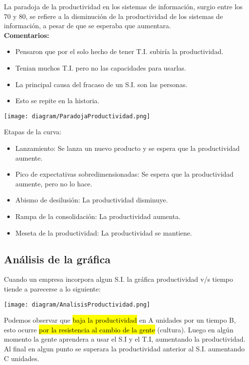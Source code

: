 \documentclass{templateNote}
\begin{document}
La paradoja de la productividad en los sistemas de informaci\'on, surgio entre los 70 y 80, se refiere a la disminuci\'on de la productividad de los sistemas de informaci\'on, a pesar de que se esperaba que aumentara.\\
\textbf{Comentarios:}
\begin{itemize}
    \item Pensaron que por el solo hecho de tener T.I. subir\'ia la productividad.
    \item Tenian muchos T.I. pero no las capacidades para usarlas.
    \item La principal causa del fracaso de un S.I. son las personas.
    \item Esto se repite en la historia.
\end{itemize}
\begin{center}
    \texttt{[image: diagram/ParadojaProductividad.png]}
\end{center}
Etapas de la curva:
\begin{itemize}
    \item Lanzamiento: Se lanza un nuevo producto y se espera que la productividad aumente.
    \item Pico de expectativas sobredimensionadas: Se espera que la productividad aumente, pero no lo hace.
    \item Abismo de desilusi\'on: La productividad disminuye.
    \item Rampa de la consolidaci\'on: La productividad aumenta.
    \item Meseta de la productividad: La productividad se mantiene.
\end{itemize}

\newpage
\subsection{An\'alisis de la gr\'afica}
Cuando un empresa incorpora algun S.I. la gr\'afica productividad v/s tiempo tiende a parecerse a lo siguiente:
\begin{center}
    \texttt{[image: diagram/AnalisisProductividad.png]}
\end{center}

Podemos observar que \hl{baja la productividad} en A unidades por un tiempo B, esto ocurre \hl{por la resistencia al cambio de la gente} (cultura).
Luego en alg\'un momento la gente aprendera a usar el S.I y el T.I, aumentando la productividad.
Al final en algun punto se superara la productividad anterior al S.I. aumentando C unidades.
\end{document}
